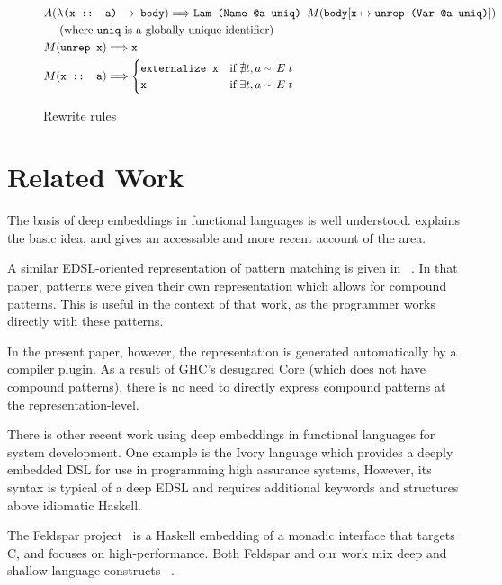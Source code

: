 \documentclass[runningheads, a4paper]{llncs}
\newcommand{\expr}[1]{(#1)} %
\newcommand{\rarr}{\rightarrow}
\newcommand{\rewrites}{\Longrightarrow}
\newcommand{\typeeq}{\raise.17ex\hbox{$\scriptstyle\mathtt{\sim}$}\,\;}
\newcommand{\ttt}{\texttt}
\begin{document}
\begin{figure}
{\begin{minipage}{\linewidth}
\begin{align*}
  &A\expr{\ttt{$\lambda$(x :: a) $\rarr$ body}} \rewrites \ttt{Lam (Name @a uniq) $M\expr{\ttt{body$[\ttt{x} \mapsto \ttt{unrep (Var @a uniq)}]$}}$}\\
  &\text{\;\;\;\;\;(where \ttt{uniq} is a globally unique identifier)}\\
  &M\expr{\ttt{unrep x}} \rewrites \ttt{x}\\
  &M\expr{\ttt{x :: a}} \rewrites
    \begin{cases}
      \ttt{externalize x} & \text{if}\; \nexists t, a\; \typeeq E\; t\\
      \ttt{x} & \text{if}\; \exists t, a\; \typeeq E\; t
    \end{cases}
\end{align*}
  \end{minipage}
}%

\caption{Rewrite rules}
\label{fig:Rewrites}

\end{figure}

\section{Related Work}


The basis of deep embeddings in functional languages is well understood.
\cite{Elliott:03:CompileDSEL-JFP} explains the basic idea, and \cite{Gill:2014:DSLSynth}
gives an accessable and more recent account of the area.

A similar EDSL-oriented representation of pattern matching is given in
~\cite[Section~3.3]{Atkey:09:Unembedding}. In that paper, patterns were given their own
representation which allows for compound patterns. This is useful in the context
of that work, as the programmer works directly with these patterns.

In the present paper, however, the representation is generated automatically by
a compiler plugin. As a result of GHC's desugared Core (which does not have
compound patterns), there is no need to directly express compound patterns at
the representation-level.

There is other recent work using deep embeddings in functional languages for 
system development.  One example is the Ivory language \cite{Elliott2015-Ivory} 
which provides a deeply embedded DSL for use in programming high assurance
systems,  However, its syntax is typical of a deep EDSL and requires additional
keywords and structures above idiomatic Haskell. 

The Feldspar project~\cite{Axelsson:10:Feldspar,Svenningsson:13:Combining}
is a Haskell embedding of a monadic interface
that targets C, and focuses on high-performance.  Both Feldspar and our work
mix deep and shallow language constructs ~\cite{Persson:11:MonadicDSL,Svenningsson:13:Compositional,Sculthorpe:13:ConstrainedMonad}.
\end{document}
